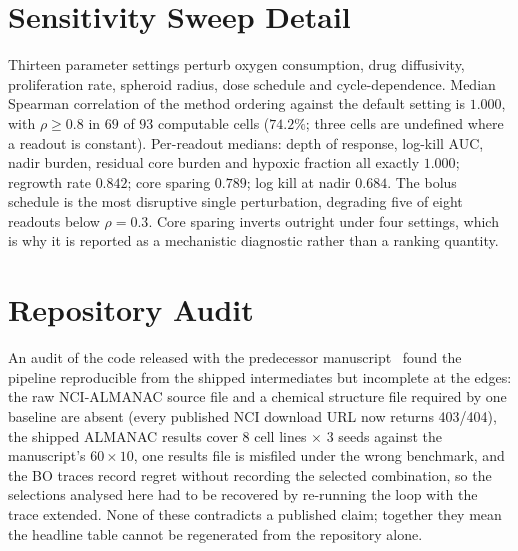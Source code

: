 \documentclass{article}
\begin{document}
\section{Sensitivity Sweep Detail}
\label{app:sweep}

Thirteen parameter settings perturb oxygen consumption, drug diffusivity,
proliferation rate, spheroid radius, dose schedule and cycle-dependence.
Median Spearman correlation of the method ordering against the default
setting is $1.000$, with $\rho \ge 0.8$ in $69$ of $93$ computable
cells ($74.2\%$; three cells are undefined where a readout is constant).
Per-readout medians: depth of response, log-kill AUC, nadir burden, residual
core burden and hypoxic fraction all exactly $1.000$; regrowth rate $0.842$;
core sparing $0.789$; log kill at nadir $0.684$. The bolus schedule is the
most disruptive single perturbation, degrading five of eight readouts below
$\rho = 0.3$. Core sparing inverts outright under four settings, which is why
it is reported as a mechanistic diagnostic rather than a ranking quantity.

\section{Repository Audit}
\label{app:audit}

An audit of the code released with the predecessor manuscript~\citep{gonehal2026savitar} found the
pipeline reproducible from the shipped intermediates but incomplete at the
edges: the raw NCI-ALMANAC source file and a chemical structure file required
by one baseline are absent (every published NCI download URL now returns
403/404), the shipped ALMANAC results cover 8 cell lines $\times$ 3 seeds
against the manuscript's $60 \times 10$, one results file is misfiled under
the wrong benchmark, and the BO traces record regret without recording the
selected combination, so the selections analysed here had to be recovered
by re-running the loop with the trace extended. None of these contradicts a
published claim; together they mean the headline table cannot be regenerated
from the repository alone.
\end{document}
